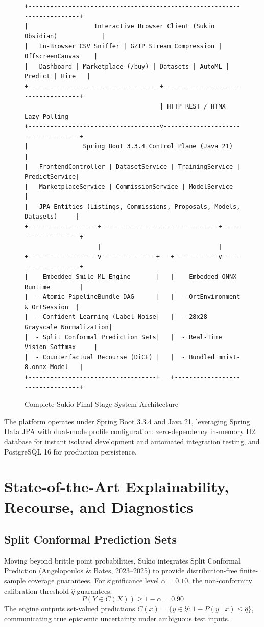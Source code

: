 \documentclass[11pt,a4paper]{article}
\begin{document}
\begin{figure}[H]
\centering
\begin{verbatim}
+-------------------------------------------------------------------------+
|                  Interactive Browser Client (Sukio Obsidian)            |
|   In-Browser CSV Sniffer | GZIP Stream Compression | OffscreenCanvas    |
|   Dashboard | Marketplace (/buy) | Datasets | AutoML | Predict | Hire   |
+------------------------------------+------------------------------------+
                                     | HTTP REST / HTMX Lazy Polling
+------------------------------------v------------------------------------+
|               Spring Boot 3.3.4 Control Plane (Java 21)                 |
|   FrontendController | DatasetService | TrainingService | PredictService|
|   MarketplaceService | CommissionService | ModelService                 |
|   JPA Entities (Listings, Commissions, Proposals, Models, Datasets)     |
+-------------------+--------------------------------+--------------------+
                    |                                |
+-------------------v---------------+   +------------v--------------------+
|    Embedded Smile ML Engine       |   |    Embedded ONNX Runtime        |
|  - Atomic PipelineBundle DAG      |   |  - OrtEnvironment & OrtSession  |
|  - Confident Learning (Label Noise|   |  - 28x28 Grayscale Normalization|
|  - Split Conformal Prediction Sets|   |  - Real-Time Vision Softmax     |
|  - Counterfactual Recourse (DiCE) |   |  - Bundled mnist-8.onnx Model   |
+-----------------------------------+   +---------------------------------+
\end{verbatim}
\caption{Complete Sukio Final Stage System Architecture}
\label{fig:arch}
\end{figure}

The platform operates under Spring Boot 3.3.4 and Java 21, leveraging Spring Data JPA with dual-mode profile configuration: zero-dependency in-memory H2 database for instant isolated development and automated integration testing, and PostgreSQL 16 for production persistence.

\section{State-of-the-Art Explainability, Recourse, and Diagnostics}

\subsection{Split Conformal Prediction Sets}
Moving beyond brittle point probabilities, Sukio integrates Split Conformal Prediction (Angelopoulos \& Bates, 2023--2025) to provide distribution-free finite-sample coverage guarantees. For significance level $\alpha=0.10$, the non-conformity calibration threshold $\hat{q}$ guarantees:
\begin{equation}
P(Y \in C(X)) \geq 1 - \alpha = 0.90
\end{equation}
The engine outputs set-valued predictions $C(x) = \{y \in \mathcal{Y} : 1 - \hat{P}(y \mid x) \leq \hat{q}\}$, communicating true epistemic uncertainty under ambiguous test inputs.
\end{document}
